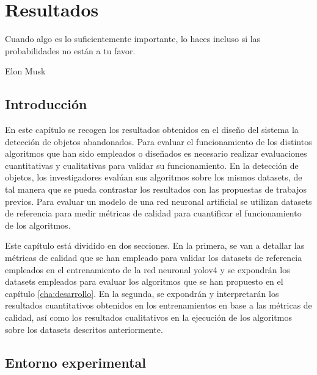 
\chapter{Resultados}
\label{cha:resultados}

\begin{FraseCelebre}
  \begin{Frase}
    Cuando algo es lo suficientemente importante, lo haces incluso si las probabilidades no están a tu favor.
  \end{Frase}
  \begin{Fuente}
    Elon Musk
  \end{Fuente}
\end{FraseCelebre}

\section{Introducción}
\label{sec:intro-resultados}

En este capítulo se recogen los resultados obtenidos en el diseño del sistema la detección de objetos abandonados. Para evaluar el funcionamiento de los distintos algoritmos que han sido empleados o diseñados es necesario realizar evaluaciones cuantitativas y cualitativas para validar su funcionamiento. En la detección de objetos, los investigadores evalúan sus algoritmos sobre los mismos datasets, de tal manera que se pueda contrastar los resultados con las propuestas de trabajos previos. Para evaluar un modelo de una red neuronal artificial se utilizan datasets de referencia para medir métricas de calidad para cuantificar el funcionamiento de los algoritmos.

Este capítulo está dividido en dos secciones. En la primera, se van a detallar las métricas de calidad que se han empleado para validar los datasets de referencia empleados en el entrenamiento de la red neuronal \gls{yolov4} y se expondrán los datasets empleados para evaluar los algoritmos que se han propuesto en el capítulo \ref{cha:desarrollo}. En la segunda, se expondrán y interpretarán los resultados cuantitativos obtenidos en los entrenamientos en base a las métricas de calidad, así como los resultados cualitativos en la ejecución de los algoritmos sobre los datasets descritos anteriormente.

\section{Entorno experimental}
\label{sec:desarrollo-resultados}

